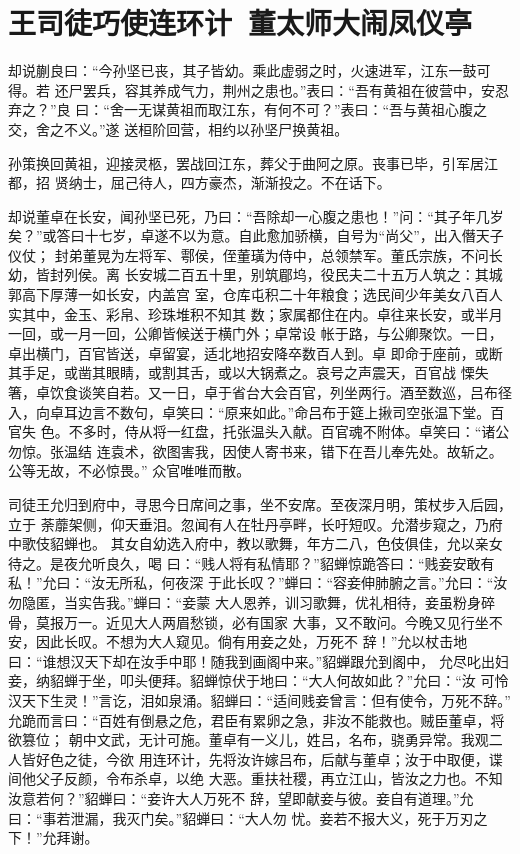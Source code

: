 \chapter{王司徒巧使连环计~董太师大闹凤仪亭}

却说蒯良曰：“今孙坚已丧，其子皆幼。乘此虚弱之时，火速进军，江东一鼓可得。若
还尸罢兵，容其养成气力，荆州之患也。”表曰：“吾有黄祖在彼营中，安忍弃之？”良
曰：“舍一无谋黄祖而取江东，有何不可？”表曰：“吾与黄祖心腹之交，舍之不义。”遂
送桓阶回营，相约以孙坚尸换黄祖。

孙策换回黄祖，迎接灵柩，罢战回江东，葬父于曲阿之原。丧事已毕，引军居江都，招
贤纳士，屈己待人，四方豪杰，渐渐投之。不在话下。

却说董卓在长安，闻孙坚已死，乃曰：“吾除却一心腹之患也！”问：“其子年几岁
矣？”或答曰十七岁，卓遂不以为意。自此愈加骄横，自号为“尚父”，出入僭天子仪仗；
封弟董晃为左将军、鄠侯，侄董璜为侍中，总领禁军。董氏宗族，不问长幼，皆封列侯。离
长安城二百五十里，别筑郿坞，役民夫二十五万人筑之：其城郭高下厚薄一如长安，内盖宫
室，仓库屯积二十年粮食；选民间少年美女八百人实其中，金玉、彩帛、珍珠堆积不知其
数；家属都住在内。卓往来长安，或半月一回，或一月一回，公卿皆候送于横门外；卓常设
帐于路，与公卿聚饮。一日，卓出横门，百官皆送，卓留宴，适北地招安降卒数百人到。卓
即命于座前，或断其手足，或凿其眼睛，或割其舌，或以大锅煮之。哀号之声震天，百官战
慄失箸，卓饮食谈笑自若。又一日，卓于省台大会百官，列坐两行。酒至数巡，吕布径
入，向卓耳边言不数句，卓笑曰：“原来如此。”命吕布于筵上揪司空张温下堂。百官失
色。不多时，侍从将一红盘，托张温头入献。百官魂不附体。卓笑曰：“诸公勿惊。张温结
连袁术，欲图害我，因使人寄书来，错下在吾儿奉先处。故斩之。公等无故，不必惊畏。”
众官唯唯而散。

司徒王允归到府中，寻思今日席间之事，坐不安席。至夜深月明，策杖步入后园，立于
荼蘼架侧，仰天垂泪。忽闻有人在牡丹亭畔，长吁短叹。允潜步窥之，乃府中歌伎貂蝉也。
其女自幼选入府中，教以歌舞，年方二八，色伎俱佳，允以亲女待之。是夜允听良久，喝
曰：“贱人将有私情耶？”貂蝉惊跪答曰：“贱妾安敢有私！”允曰：“汝无所私，何夜深
于此长叹？”蝉曰：“容妾伸肺腑之言。”允曰：“汝勿隐匿，当实告我。”蝉曰：“妾蒙
大人恩养，训习歌舞，优礼相待，妾虽粉身碎骨，莫报万一。近见大人两眉愁锁，必有国家
大事，又不敢问。今晚又见行坐不安，因此长叹。不想为大人窥见。倘有用妾之处，万死不
辞！”允以杖击地曰：“谁想汉天下却在汝手中耶！随我到画阁中来。”貂蝉跟允到阁中，
允尽叱出妇妾，纳貂蝉于坐，叩头便拜。貂蝉惊伏于地曰：“大人何故如此？”允曰：“汝
可怜汉天下生灵！”言讫，泪如泉涌。貂蝉曰：“适间贱妾曾言：但有使令，万死不辞。”
允跪而言曰：“百姓有倒悬之危，君臣有累卵之急，非汝不能救也。贼臣董卓，将欲篡位；
朝中文武，无计可施。董卓有一义儿，姓吕，名布，骁勇异常。我观二人皆好色之徒，今欲
用连环计，先将汝许嫁吕布，后献与董卓；汝于中取便，谍间他父子反颜，令布杀卓，以绝
大恶。重扶社稷，再立江山，皆汝之力也。不知汝意若何？”貂蝉曰：“妾许大人万死不
辞，望即献妾与彼。妾自有道理。”允曰：“事若泄漏，我灭门矣。”貂蝉曰：“大人勿
忧。妾若不报大义，死于万刃之下！”允拜谢。

